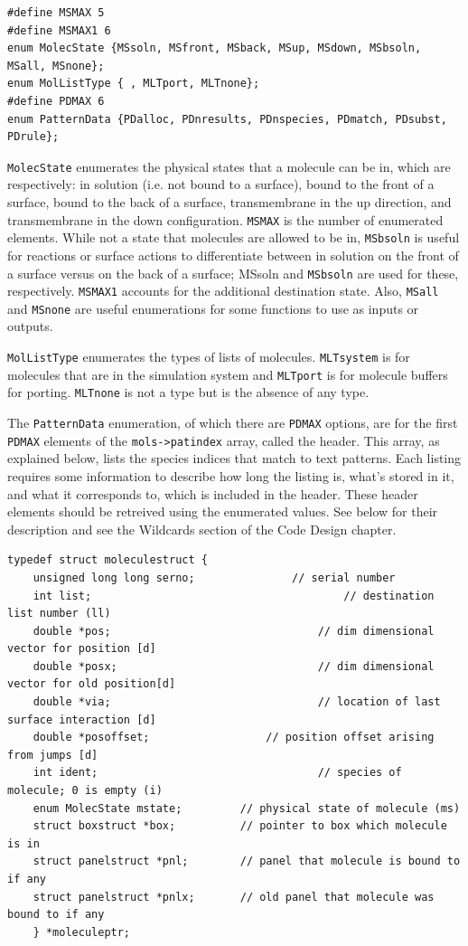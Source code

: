 \documentclass {scrbook}
\newcommand {\ttt} {\texttt}
\begin{document}
\begin{lstlisting}
#define MSMAX 5
#define MSMAX1 6
enum MolecState {MSsoln, MSfront, MSback, MSup, MSdown, MSbsoln, MSall, MSnone};
enum MolListType { , MLTport, MLTnone};
#define PDMAX 6
enum PatternData {PDalloc, PDnresults, PDnspecies, PDmatch, PDsubst, PDrule};
\end{lstlisting}

\ttt{MolecState} enumerates the physical states that a molecule can be in, which are respectively: in solution (i.e. not bound to a surface), bound to the front of a surface, bound to the back of a surface, transmembrane in the up direction, and transmembrane in the down configuration. \ttt{MSMAX} is the number of enumerated elements. While not a state that molecules are allowed to be in, \ttt{MSbsoln} is useful for reactions or surface actions to differentiate between in solution on the front of a surface versus on the back of a surface; MSsoln and \ttt{MSbsoln} are used for these, respectively. \ttt{MSMAX1} accounts for the additional destination state. Also, \ttt{MSall} and \ttt{MSnone} are useful enumerations for some functions to use as inputs or outputs.

\ttt{MolListType} enumerates the types of lists of molecules. \ttt{MLTsystem} is for molecules that are in the simulation system and \ttt{MLTport} is for molecule buffers for porting. \ttt{MLTnone} is not a type but is the absence of any type.

The \ttt{PatternData} enumeration, of which there are \ttt{PDMAX} options, are for the first \ttt{PDMAX} elements of the \ttt{mols->patindex} array, called the header. This array, as explained below, lists the species indices that match to text patterns. Each listing requires some information to describe how long the listing is, what's stored in it, and what it corresponds to, which is included in the header. These header elements should be retreived using the enumerated values. See below for their description and see the Wildcards section of the Code Design chapter.

\begin{lstlisting}
typedef struct moleculestruct {
	unsigned long long serno;				// serial number
	int list;										// destination list number (ll)
	double *pos;								// dim dimensional vector for position [d]
	double *posx;								// dim dimensional vector for old position[d]
	double *via;								// location of last surface interaction [d]
	double *posoffset;					// position offset arising from jumps [d]
	int ident;									// species of molecule; 0 is empty (i)
	enum MolecState mstate;			// physical state of molecule (ms)
	struct boxstruct *box;			// pointer to box which molecule is in
	struct panelstruct *pnl;		// panel that molecule is bound to if any
	struct panelstruct *pnlx;		// old panel that molecule was bound to if any
	} *moleculeptr;
\end{lstlisting}
\end{document}
